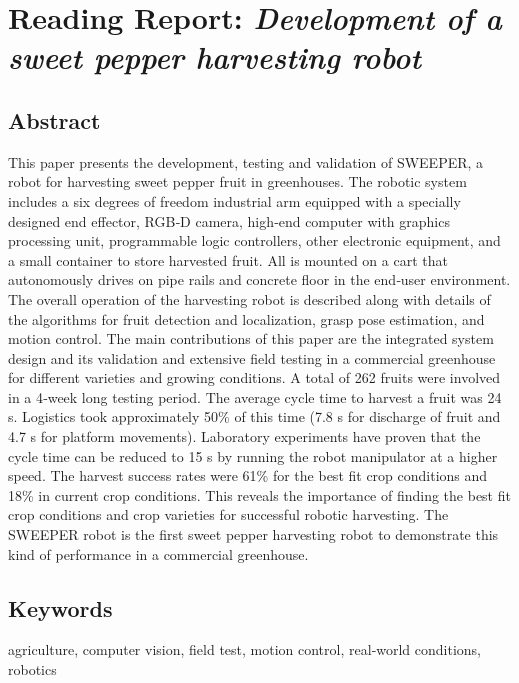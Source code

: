     
    
    \newpage
    \section{Reading Report: \emph{Development of a sweet pepper harvesting robot}}
    \label{sec:Arad2020}
    \cite{Arad2020}
    
    \subsection*{Abstract}
    This paper presents the development, testing and validation of SWEEPER, a robot for
    harvesting sweet pepper fruit in greenhouses. The robotic system includes a six
    degrees of freedom industrial arm equipped with a specially designed end effector,
    RGB‐D camera, high‐end computer with graphics processing unit, programmable logic
    controllers, other electronic equipment, and a small container to store harvested
    fruit. All is mounted on a cart that autonomously drives on pipe rails and concrete
    floor in the end‐user environment. The overall operation of the harvesting robot is
    described along with details of the algorithms for fruit detection and localization,
    grasp pose estimation, and motion control. The main contributions of this paper are
    the integrated system design and its validation and extensive field testing in a
    commercial greenhouse for different varieties and growing conditions. A total of 262
    fruits were involved in a 4‐week long testing period. The average cycle time to
    harvest a fruit was 24 s. Logistics took approximately 50\% of this time (7.8 s for
    discharge of fruit and 4.7 s for platform movements). Laboratory experiments have
    proven that the cycle time can be reduced to 15 s by running the robot manipulator at
    a higher speed. The harvest success rates were 61\% for the best fit crop conditions
    and 18\% in current crop conditions. This reveals the importance of finding the best fit
    crop conditions and crop varieties for successful robotic harvesting. The SWEEPER
    robot is the first sweet pepper harvesting robot to demonstrate this kind of
    performance in a commercial greenhouse.
    
    
    \subsection*{Keywords}
    agriculture, computer vision, field test, motion control, real‐world conditions, robotics
    
